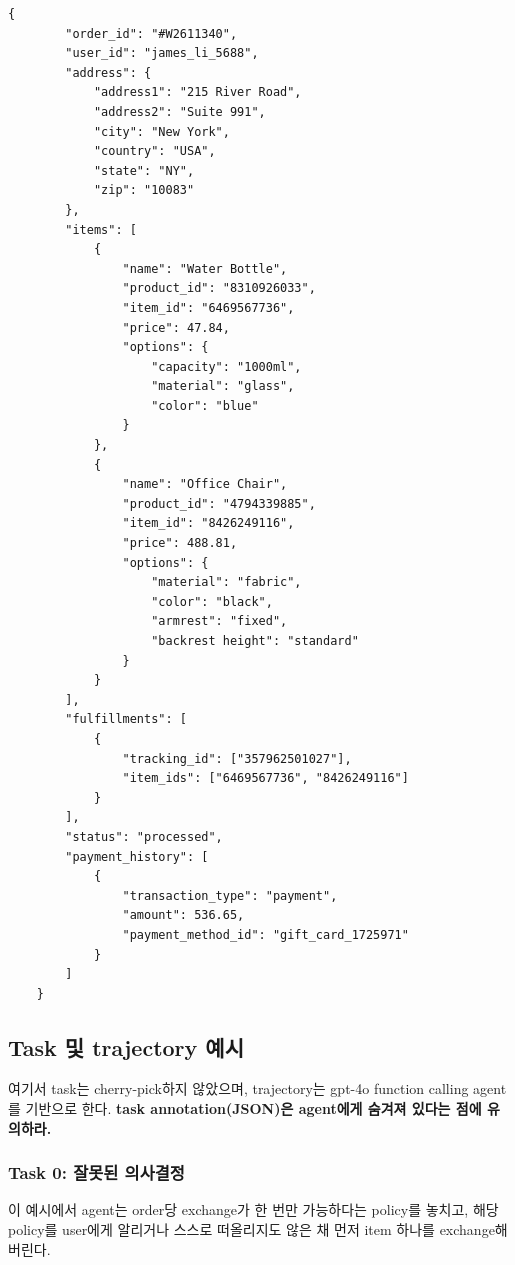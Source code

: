 \begin{listing}[ht]
\begin{verbatim}
{
        "order_id": "#W2611340",
        "user_id": "james_li_5688",
        "address": {
            "address1": "215 River Road",
            "address2": "Suite 991",
            "city": "New York",
            "country": "USA",
            "state": "NY",
            "zip": "10083"
        },
        "items": [
            {
                "name": "Water Bottle",
                "product_id": "8310926033",
                "item_id": "6469567736",
                "price": 47.84,
                "options": {
                    "capacity": "1000ml",
                    "material": "glass",
                    "color": "blue"
                }
            },
            {
                "name": "Office Chair",
                "product_id": "4794339885",
                "item_id": "8426249116",
                "price": 488.81,
                "options": {
                    "material": "fabric",
                    "color": "black",
                    "armrest": "fixed",
                    "backrest height": "standard"
                }
            }
        ],
        "fulfillments": [
            {
                "tracking_id": ["357962501027"],
                "item_ids": ["6469567736", "8426249116"]
            }
        ],
        "status": "processed",
        "payment_history": [
            {
                "transaction_type": "payment",
                "amount": 536.65,
                "payment_method_id": "gift_card_1725971"
            }
        ]
    }
\end{verbatim}
\caption{\retail{}의 orders database entry 예시.}
\end{listing}

\newpage
\clearpage

\subsection{Task 및 trajectory 예시}
\label{sec:retail_trajs}

여기서 task는 cherry-pick하지 않았으며, trajectory는 gpt-4o function calling agent를 기반으로 한다. \textbf{task annotation(JSON)은 agent에게 숨겨져 있다는 점에 유의하라.}

\subsubsection{Task 0: 잘못된 의사결정} \label{sec:wrong_decision}
이 예시에서 agent는 order당 exchange가 한 번만 가능하다는 policy를 놓치고, 해당 policy를 user에게 알리거나 스스로 떠올리지도 않은 채 먼저 item 하나를 exchange해 버린다.

